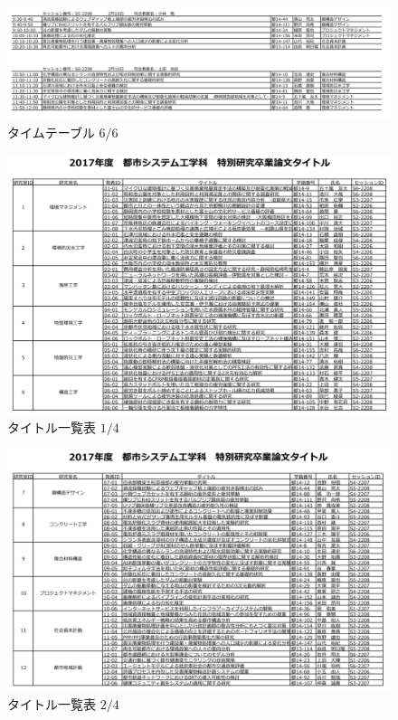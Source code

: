\documentclass[a4paper,12pt,fleqn]{jarticle}
\begin{document}
\begin{figure}[H]
  \begin{center}
    \includegraphics[scale=0.65]{t6.png}
    \caption{タイムテーブル $6/6$}
  \end{center}
\end{figure}

\begin{figure}[H]
  \begin{center}
    \includegraphics[scale=0.65]{ti3.png}
    \caption{タイトル一覧表 $1/4$}
  \end{center}
\end{figure}

\begin{figure}[H]
  \begin{center}
    \includegraphics[scale=0.7]{ti4.png}
    \caption{タイトル一覧表 $2/4$}
  \end{center}
\end{figure}
\end{document}
